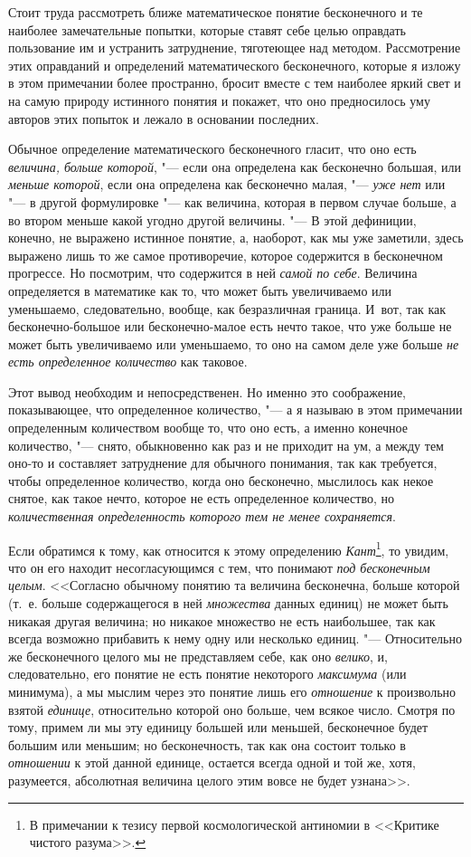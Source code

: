 Стоит труда рассмотреть ближе математическое понятие бесконечного и те
наиболее замечательные попытки, которые ставят себе целью оправдать
пользование им и устранить затруднение, тяготеющее над методом.
Рассмотрение этих оправданий и определений математического бесконечного,
которые я изложу в этом примечании более пространно, бросит вместе с тем
наиболее яркий свет и на самую природу истинного понятия и покажет, что оно
предносилось уму авторов этих попыток и лежало в основании последних.

Обычное определение математического бесконечного гласит, что оно есть
{\em величина, больше которой}, "--- если она определена
как бесконечно большая, или {\em меньше которой}, если
она определена как бесконечно малая, "--- {\em уже нет}
или "--- в другой формулировке "--- как величина, которая в первом случае больше,
а во втором меньше какой угодно другой величины. "--- В этой дефиниции,
конечно, не выражено истинное понятие, а, наоборот, как мы уже заметили,
здесь выражено лишь то же самое противоречие, которое содержится в
бесконечном прогрессе. Но посмотрим, что содержится в ней
{\em самой по себе}. Величина определяется в математике
как то, что может быть увеличиваемо или уменьшаемо, следовательно, вообще,
как безразличная граница. И~вот, так как бесконечно-большое или
бесконечно-малое есть нечто такое, что уже больше не может быть
увеличиваемо или уменьшаемо, то оно на самом деле уже больше
{\em не есть определенное количество} как таковое.

Этот вывод необходим и непосредственен. Но именно это соображение,
показывающее, что определенное количество, "--- а я называю в этом примечании
определенным количеством вообще то, что оно есть, а именно конечное
количество, "--- снято, обыкновенно как раз и не приходит на ум, а между тем
оно-то и составляет затруднение для обычного понимания, так как требуется,
чтобы определенное количество, когда оно бесконечно, мыслилось как некое
снятое, как такое нечто, которое не есть определенное количество, но
{\em количественная определенность которого тем не
менее сохраняется}.

Если обратимся к тому, как относится к этому определению
{\em Кант}\footnote{В примечании к тезису
первой космологической антиномии в <<Критике чистого разума>>.}, то увидим,
что он его находит несогласующимся с тем, что понимают
{\em под бесконечным целым}. <<Согласно обычному понятию
та величина бесконечна, больше которой (т.~е. больше содержащегося в ней
{\em множества} данных единиц) не может быть никакая
другая величина; но никакое множество не есть наибольшее, так как всегда
возможно прибавить к нему одну или несколько единиц. "--- Относительно же
бесконечного целого мы не представляем себе, как оно
{\em велико}, и, следовательно, его понятие не есть
понятие некоторого {\em максимума} (или минимума), а мы
мыслим через это понятие лишь его {\em отношение} к
произвольно взятой {\em единице}, относительно которой
оно больше, чем всякое число. Смотря по тому, примем ли мы эту единицу
большей или меньшей, бесконечное будет большим или меньшим; но
бесконечность, так как она состоит только в
{\em отношении} к этой данной единице, остается всегда
одной и той же, хотя, разумеется, абсолютная величина целого этим вовсе не
будет узнана>>.

